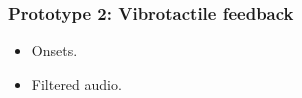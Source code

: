 \documentclass{beamer}
\begin{document}

\begin{frame}
\frametitle{Prototype 2: Vibrotactile feedback}
	\begin{itemize}[<+->]
	\item Onsets.%
	\item Filtered audio.
	\end{itemize}
\end{frame}



%


%
\end{document}
